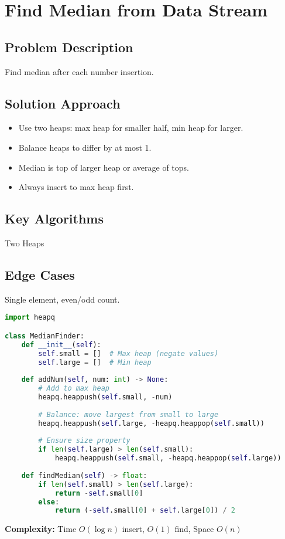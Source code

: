\documentclass[10pt, a4paper]{article}
\begin{document}
\section{Find Median from Data Stream}
\subsection*{Problem Description}
Find median after each number insertion.

\subsection*{Solution Approach}
\begin{itemize}
    \item Use two heaps: max heap for smaller half, min heap for larger.
    \item Balance heaps to differ by at most 1.
    \item Median is top of larger heap or average of tops.
    \item Always insert to max heap first.
\end{itemize}

\subsection*{Key Algorithms}
Two Heaps

\subsection*{Edge Cases}
Single element, even/odd count.

\begin{lstlisting}[language=Python]
import heapq

class MedianFinder:
    def __init__(self):
        self.small = []  # Max heap (negate values)
        self.large = []  # Min heap
    
    def addNum(self, num: int) -> None:
        # Add to max heap
        heapq.heappush(self.small, -num)
        
        # Balance: move largest from small to large
        heapq.heappush(self.large, -heapq.heappop(self.small))
        
        # Ensure size property
        if len(self.large) > len(self.small):
            heapq.heappush(self.small, -heapq.heappop(self.large))
    
    def findMedian(self) -> float:
        if len(self.small) > len(self.large):
            return -self.small[0]
        else:
            return (-self.small[0] + self.large[0]) / 2
\end{lstlisting}
\textbf{Complexity:} Time $O(\log n)$ insert, $O(1)$ find, Space $O(n)$
\end{document}
